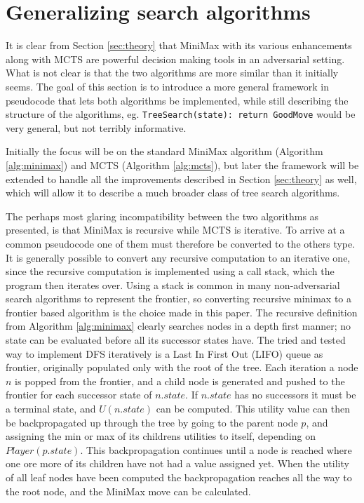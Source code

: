 \section{Generalizing search algorithms}

It is clear from Section \ref{sec:theory} that MiniMax with its various
enhancements along with MCTS are powerful decision making tools in an 
adversarial setting. What is not clear is that the two algorithms are more
similar than it initially seems. The goal of this section is to introduce 
a more general framework in pseudocode that lets both algorithms be 
implemented, while still describing the structure of the algorithms, eg.
\lstinline|TreeSearch(state): return GoodMove| would be very general, but
not terribly informative.

Initially the focus will be on the standard MiniMax algorithm (Algorithm 
\ref{alg:minimax}) and MCTS (Algorithm \ref{alg:mcts}), but later the 
framework will be extended to handle all the improvements described in 
Section \ref{sec:theory} as well, which will allow it to describe a much 
broader class of tree search algorithms.

The perhaps most glaring incompatibility between the two algorithms as
presented, is that MiniMax is recursive while MCTS is iterative. To
arrive at a common pseudocode one of them must therefore be converted
to the others type. It is generally possible to convert any recursive
computation to an iterative one, since the recursive computation is
implemented using a call stack, which the program then iterates 
over. Using a stack is common in many non-adversarial search algorithms
to represent the frontier, so converting recursive minimax to a 
frontier based algorithm is the choice made in this paper. 
The recursive definition from 
Algorithm \ref{alg:minimax} clearly searches nodes in a depth first
manner; no state can be evaluated before all its successor states
have. The tried and tested way to implement DFS
iteratively is a Last In First Out (LIFO) queue as frontier, originally populated
only with the root of the tree. Each iteration a node $n$ is popped from the
frontier, and a child node is generated and pushed to the frontier for each
successor state of $n.state$. If $n.state$ has no successors it must be
a terminal state, and $U(n.state)$ can be computed. This utility value
can then be backpropagated up through the tree by going to the parent node
$p$, and assigning the min or max of its childrens utilities to itself, 
depending on $Player(p.state)$. This backpropagation continues until
a node is reached where one ore more of its children have not had a value
assigned yet. When the utility of all leaf nodes have been computed the
backpropagation reaches all the way to the root node, and the MiniMax move
can be calculated.

